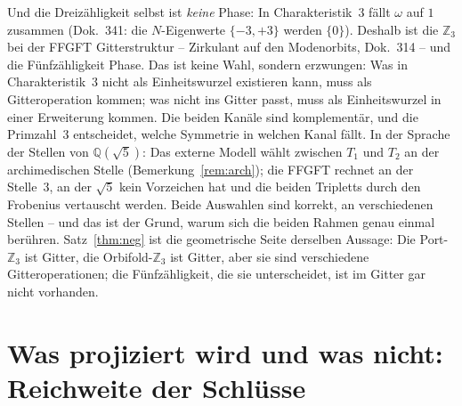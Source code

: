 Und die Dreizähligkeit selbst ist \emph{keine} Phase: In Charakteristik~3
fällt $\omega$ auf $1$ zusammen (Dok.~341: die $N$-Eigenwerte $\{-3,+3\}$
werden $\{0\}$). Deshalb ist die $\mathbb{Z}_3$ bei der FFGFT
Gitterstruktur -- Zirkulant auf den Modenorbits, Dok.~314 -- und die
Fünfzähligkeit Phase. Das ist keine Wahl, sondern erzwungen: Was in
Charakteristik~3 nicht als Einheitswurzel existieren kann, muss als
Gitteroperation kommen; was nicht ins Gitter passt, muss als
Einheitswurzel in einer Erweiterung kommen. Die beiden Kanäle sind
komplementär, und die Primzahl~3 entscheidet, welche Symmetrie in welchen
Kanal fällt. In der Sprache der Stellen von $\mathbb{Q}(\sqrt5)$: Das
externe Modell wählt zwischen $T_1$ und $T_2$ an der archimedischen Stelle
(Bemerkung~\ref{rem:arch}); die FFGFT rechnet an der Stelle~3, an der
$\sqrt5$ kein Vorzeichen hat und die beiden Tripletts durch den Frobenius
vertauscht werden. Beide Auswahlen sind korrekt, an verschiedenen Stellen
-- und das ist der Grund, warum sich die beiden Rahmen genau einmal
berühren. Satz~\ref{thm:neg} ist die geometrische Seite derselben
Aussage: Die Port-$\mathbb{Z}_3$ ist Gitter, die Orbifold-$\mathbb{Z}_3$
ist Gitter, aber sie sind verschiedene Gitteroperationen; die
Fünfzähligkeit, die sie unterscheidet, ist im Gitter gar nicht vorhanden.

\section{Was projiziert wird und was nicht: Reichweite der Schlüsse}\label{sec:reichweite}

